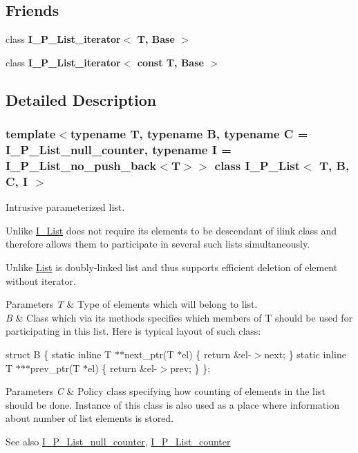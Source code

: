 \subsection*{Friends}
\begin{DoxyCompactItemize}
\item 
\mbox{\label{classI__P__List_ae95eea8c89cdfb13e0be8dfc09206060}} 
class {\bfseries I\+\_\+\+P\+\_\+\+List\+\_\+iterator$<$ T, Base $>$}
\item 
\mbox{\label{classI__P__List_a5eb918a3858175d5da91eefd14c84bd5}} 
class {\bfseries I\+\_\+\+P\+\_\+\+List\+\_\+iterator$<$ const T, Base $>$}
\end{DoxyCompactItemize}


\subsection{Detailed Description}
\subsubsection*{template$<$typename T, typename B, typename C = I\+\_\+\+P\+\_\+\+List\+\_\+null\+\_\+counter, typename I = I\+\_\+\+P\+\_\+\+List\+\_\+no\+\_\+push\+\_\+back$<$\+T$>$$>$\newline
class I\+\_\+\+P\+\_\+\+List$<$ T, B, C, I $>$}

Intrusive parameterized list.

Unlike \mbox{\hyperlink{classI__List}{I\+\_\+\+List}} does not require its elements to be descendant of ilink class and therefore allows them to participate in several such lists simultaneously.

Unlike \mbox{\hyperlink{classList}{List}} is doubly-\/linked list and thus supports efficient deletion of element without iterator.


\begin{DoxyParams}{Parameters}
{\em T} & Type of elements which will belong to list. \\
\hline
{\em B} & Class which via its methods specifies which members of T should be used for participating in this list. Here is typical layout of such class\+:\\
\hline
\end{DoxyParams}
struct B \{ static inline T $\ast$$\ast$next\+\_\+ptr(T $\ast$el) \{ return \&el-\/$>$next; \} static inline T $\ast$$\ast$$\ast$prev\+\_\+ptr(T $\ast$el) \{ return \&el-\/$>$prev; \} \}; 
\begin{DoxyParams}{Parameters}
{\em C} & Policy class specifying how counting of elements in the list should be done. Instance of this class is also used as a place where information about number of list elements is stored. \\
\hline
\end{DoxyParams}
\begin{DoxySeeAlso}{See also}
\mbox{\hyperlink{classI__P__List__null__counter}{I\+\_\+\+P\+\_\+\+List\+\_\+null\+\_\+counter}}, \mbox{\hyperlink{classI__P__List__counter}{I\+\_\+\+P\+\_\+\+List\+\_\+counter}} 
\end{DoxySeeAlso}

